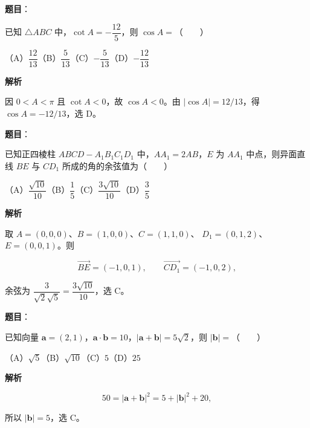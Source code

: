 \begin{answer}

\textbf{题目}：

已知 $\triangle ABC$ 中，$\cot A=-\dfrac{12}{5}$，则 $\cos A=$\mbox{（　　）}

（A）$\dfrac{12}{13}$\quad（B）$\dfrac5{13}$\quad（C）$-\dfrac5{13}$\quad（D）$-\dfrac{12}{13}$

\textbf{解析}

因 $0<A<\pi$ 且 $\cot A<0$，故 $\cos A<0$。由
$|\cos A|=12/13$，得 $\cos A=-12/13$，选 D。


\end{answer}
\begin{answer}

\textbf{题目}：

已知正四棱柱 $ABCD-A_1B_1C_1D_1$ 中，$AA_1=2AB$，$E$ 为 $AA_1$ 中点，则异面直线 $BE$ 与 $CD_1$ 所成的角的余弦值为\mbox{（　　）}

（A）$\dfrac{\sqrt{10}}{10}$\quad（B）$\dfrac15$\quad（C）$\dfrac{3\sqrt{10}}{10}$\quad（D）$\dfrac35$

\textbf{解析}

取 $A=(0,0,0)$、$B=(1,0,0)$、$C=(1,1,0)$、
$D_1=(0,1,2)$、$E=(0,0,1)$。则

\nopagebreak[4]
\[
\overrightarrow{BE}=(-1,0,1),\qquad
\overrightarrow{CD_1}=(-1,0,2),
\]

余弦为 $\dfrac3{\sqrt2\sqrt5}=\dfrac{3\sqrt{10}}{10}$，选 C。


\end{answer}
\begin{answer}

\textbf{题目}：

已知向量 $\boldsymbol a=(2,1)$，$\boldsymbol a\cdot\boldsymbol b=10$，$|\boldsymbol a+\boldsymbol b|=5\sqrt2$，则 $|\boldsymbol b|=$\mbox{（　　）}

（A）$\sqrt5$\quad（B）$\sqrt{10}$\quad（C）$5$\quad（D）$25$

\textbf{解析}

\nopagebreak[4]
\[
50=|\boldsymbol a+\boldsymbol b|^2
=5+|\boldsymbol b|^2+20,
\]

所以 $|\boldsymbol b|=5$，选 C。


\end{answer}

